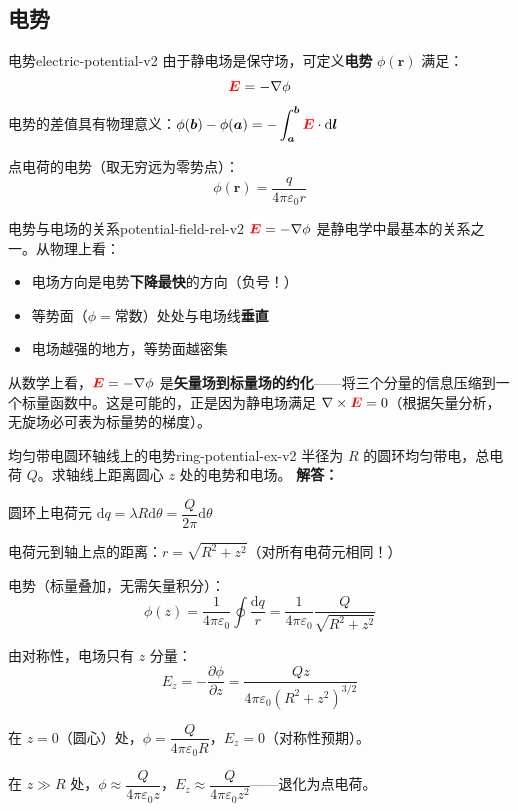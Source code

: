 \documentclass[11pt,a4paper,openany,oneside]{book}
\newcommand{\diff}{\mathrm{d}}
\newcommand{\vecE}{\textcolor{red}{\vect{E}}}
\newcommand{\eps}{\varepsilon}
\newcommand{\vect}[1]{\bm{#1}}
\newcommand{\grad}{\nabla}
\newcommand{\curl}{\nabla\times}
\newcommand{\difficulty}[1]{\marginnote{\textcolor{red}{\textbf{[#1]}}}}
\begin{document}
\subsection{电势}

\begin{definition}{电势}{electric-potential-v2}
由于静电场是保守场，可定义\textbf{电势} $\phi(\vect{r})$ 满足：
\[
\vecE = -\grad\phi
\]
电势的差值具有物理意义：$\phi(\vect{b}) - \phi(\vect{a}) = -\displaystyle\int_{\vect{a}}^{\vect{b}} \vecE \cdot \diff\vect{l}$

点电荷的电势（取无穷远为零势点）：
\[
\phi(\vect{r}) = \frac{q}{4\pi\eps_0 r}
\]
\end{definition}

\begin{insight}{电势与电场的关系}{potential-field-rel-v2}
$\vecE = -\grad\phi$ 是静电学中最基本的关系之一。从物理上看：
\begin{itemize}
\item 电场方向是电势\textbf{下降最快}的方向（负号！）
\item 等势面（$\phi = \text{常数}$）处处与电场线\textbf{垂直}
\item 电场越强的地方，等势面越密集
\end{itemize}

从数学上看，$\vecE = -\grad\phi$ 是\textbf{矢量场到标量场的约化}——将三个分量的信息压缩到一个标量函数中。这是可能的，正是因为静电场满足 $\curl\vecE = 0$（根据矢量分析，无旋场必可表为标量势的梯度）。
\end{insight}

\begin{example}{均匀带电圆环轴线上的电势}{ring-potential-ex-v2}
\difficulty{基础}
半径为 $R$ 的圆环均匀带电，总电荷 $Q$。求轴线上距离圆心 $z$ 处的电势和电场。
\tcblower
\textbf{解答：}

圆环上电荷元 $\diff q = \lambda R\diff\theta = \dfrac{Q}{2\pi} \diff\theta$

电荷元到轴上点的距离：$r = \sqrt{R^2 + z^2}$（对所有电荷元相同！）

电势（标量叠加，无需矢量积分）：
\[
\phi(z) = \frac{1}{4\pi\eps_0} \oint \frac{\diff q}{r} = \frac{1}{4\pi\eps_0} \frac{Q}{\sqrt{R^2+z^2}}
\]

由对称性，电场只有 $z$ 分量：
\[
E_z = -\frac{\partial\phi}{\partial z} = \frac{Qz}{4\pi\eps_0 (R^2+z^2)^{3/2}}
\]

在 $z = 0$（圆心）处，$\phi = \dfrac{Q}{4\pi\eps_0 R}$，$E_z = 0$（对称性预期）。

在 $z \gg R$ 处，$\phi \approx \dfrac{Q}{4\pi\eps_0 z}$，$E_z \approx \dfrac{Q}{4\pi\eps_0 z^2}$——退化为点电荷。
\end{example}
\end{document}
